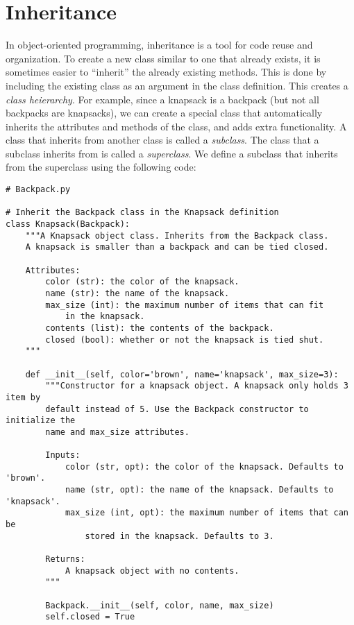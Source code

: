\section*{Inheritance}

In object-oriented programming, inheritance is a tool for code reuse and organization.
To create a new class similar to one that already exists, it is sometimes easier to ``inherit'' the already existing methods.
This is done by including the existing class as an argument in the class definition.
This creates a \emph{class heierarchy}.
For example, since a knapsack is a backpack (but not all backpacks are knapsacks), we can create a special  class that automatically inherits the attributes and methods of the  class, and adds extra functionality.
A class that inherits from another class is called a \emph{subclass}.
The class that a subclass inherits from is called a \emph{superclass}.
We define a  subclass that inherits from the  superclass using the following code:

\begin{lstlisting}
# Backpack.py

# Inherit the Backpack class in the Knapsack definition
class Knapsack(Backpack):
    """A Knapsack object class. Inherits from the Backpack class.
    A knapsack is smaller than a backpack and can be tied closed.
    
    Attributes:
        color (str): the color of the knapsack.
        name (str): the name of the knapsack.
        max_size (int): the maximum number of items that can fit
            in the knapsack.
        contents (list): the contents of the backpack.
        closed (bool): whether or not the knapsack is tied shut.
    """
    
    def __init__(self, color='brown', name='knapsack', max_size=3):
        """Constructor for a knapsack object. A knapsack only holds 3 item by
        default instead of 5. Use the Backpack constructor to initialize the
        name and max_size attributes.
        
        Inputs:
            color (str, opt): the color of the knapsack. Defaults to 'brown'.
            name (str, opt): the name of the knapsack. Defaults to 'knapsack'.
            max_size (int, opt): the maximum number of items that can be
                stored in the knapsack. Defaults to 3.
        
        Returns:
            A knapsack object with no contents.
        """
        
        Backpack.__init__(self, color, name, max_size)
        self.closed = True
\end{lstlisting}

